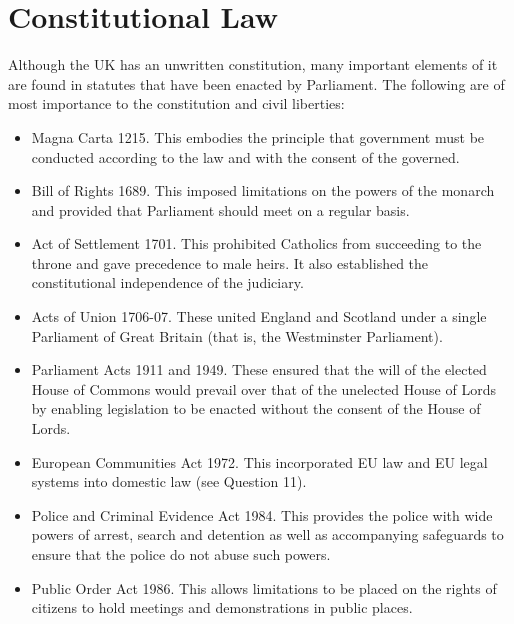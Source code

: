 \documentclass[14pt,titlepage]{extarticle}
\begin{document}


\section{Constitutional Law}\label{ConstitutionalLaw}

Although the UK has an unwritten constitution, many important elements of it are found in statutes that have been enacted by Parliament. The following are of most importance to the constitution and civil liberties:

\begin{itemize}
  
\item Magna Carta 1215. This embodies the principle that government must be conducted according to the law and with the consent of the governed.

\item Bill of Rights 1689. This imposed limitations on the powers of the monarch and provided that Parliament should meet on a regular basis.

\item Act of Settlement 1701. This prohibited Catholics from succeeding to the throne and gave precedence to male heirs. It also established the constitutional independence of the judiciary.

\item Acts of Union 1706-07. These united England and Scotland under a single Parliament of Great Britain (that is, the Westminster Parliament).

\item Parliament Acts 1911 and 1949. These ensured that the will of the elected House of Commons would prevail over that of the unelected House of Lords by enabling legislation to be enacted without the consent of the House of Lords.

\item European Communities Act 1972. This incorporated EU law and EU legal systems into domestic law (see Question 11).

\item Police and Criminal Evidence Act 1984. This provides the police with wide powers of arrest, search and detention as well as accompanying safeguards to ensure that the police do not abuse such powers.

\item Public Order Act 1986. This allows limitations to be placed on the rights of citizens to hold meetings and demonstrations in public places.


\end{itemize}
\end{document}

